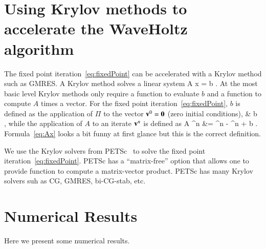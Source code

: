 \documentclass[preprint,11pt]{elsarticle}
\begin{document}
\section{Using Krylov methods to accelerate the WaveHoltz algorithm} \label{sec:KrylovAcceleration} 

The fixed point iteration~\eqref{eq:fixedPoint} can be accelerated with a Krylov
method such as GMRES.
A Krylov method solves a linear system
\ba
    A x = b .
\ea
At the most basic level Krylov methods only require a function to evaluate $b$ and a function
to compute $A$ times a vector.
For the fixed point iteration~\eqref{eq:fixedPoint}, $b$ is defined as the application of $\Pi$ to
the vector $\mathbf{ v}^0=\mathbf{0}$ (zero initial conditions),
\ba
&      b \eqdef \Pi\, \zerov,
\ea
while the application of $A$ to an iterate $\mathbf{ v}^n$ is defined as 
\ba
  A \vv^n &=  \vv^n - \Pi\vv^n + b .   \label{eq:Ax}
\ea
Formula~\eqref{eq:Ax} looks a bit funny at first glance but this is the correct definition.

We use the Krylov solvers from PETSc~\cite{petsc} to solve the fixed point iteration~\eqref{eq:fixedPoint}.
PETSc has a ``matrix-free'' option that allows one to provide function to compute
a matrix-vector product. PETSc has many Krylov solvers suh as CG, GMRES, bi-CG-stab, etc.


\section{Numerical Results} \label{sec:numericalResults}

Here we present some numerical results.





\clearpage







\end{document}
